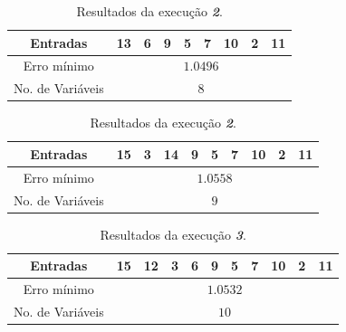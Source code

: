 \begin{enumerate}
\begin{enumerate}
			\begin{table}[H]
					\setlength\tabcolsep{4pt}
					\begin{minipage}{0.48\textwidth}
					    \centering
					    \footnotesize
						\caption{\label{tab:backward1_wine} Resultados da execução
						\textit{\textbf{1}}.}
					    \vspace{-6pt}
						\begin{tabular}{|c | c | c | c | c | c | c | c | c |}
						\hline
						Entradas & 13 & 6 & 9 & 5 & 7 & 10 & 2 & 11 \\
						\hline
						Erro mínimo & \multicolumn{8}{c|}{\(1.0496\)}  \\ \hline
						No. de Variáveis & \multicolumn{8}{c|}{\(8\)}  \\
						\hline
						
						\end{tabular}
					\end{minipage}	    
					\begin{minipage}{0.48\textwidth}
					    \centering
						\caption{\label{tab:backward2_wine} Resultados da execução
						\textit{\textbf{2}}.}
						\footnotesize
					    \vspace{-6pt}
						\begin{tabular}{|c | c | c | c | c | c | c | c | c | c |}
						\hline
						Entradas & 15 & 3 & 14 & 9 & 5 & 7 & 10 & 2 & 11  \\
						\hline
						Erro mínimo & \multicolumn{9}{c|}{\(1.0558\)}  \\ \hline
						No. de Variáveis & \multicolumn{9}{c|}{\(9\)}  \\
						\hline
						
						\end{tabular}	
					\end{minipage}	    
			    \end{table}     

		\vspace{-12pt}

			\begin{table}[H]
					\setlength\tabcolsep{4pt}
					\begin{minipage}{0.48\textwidth}
					    \centering
					    \footnotesize
						\caption{\label{tab:backward3_wine} Resultados da execução
						\textit{\textbf{3}}.}
					    \vspace{-6pt}
						\begin{tabular}{|c | c | c | c | c | c | c | c | c | c | c |}
						\hline
						Entradas & 15 & 12 & 3 & 6 & 9 & 5 & 7 & 10 & 2 & 11  \\
						\hline
						Erro mínimo & \multicolumn{10}{c|}{\(1.0532\)}  \\ \hline
						No. de Variáveis & \multicolumn{10}{c|}{\(10\)}  \\
						\hline
						

\end{tabular}
\end{minipage}
\end{table}
\end{enumerate}
\end{enumerate}
